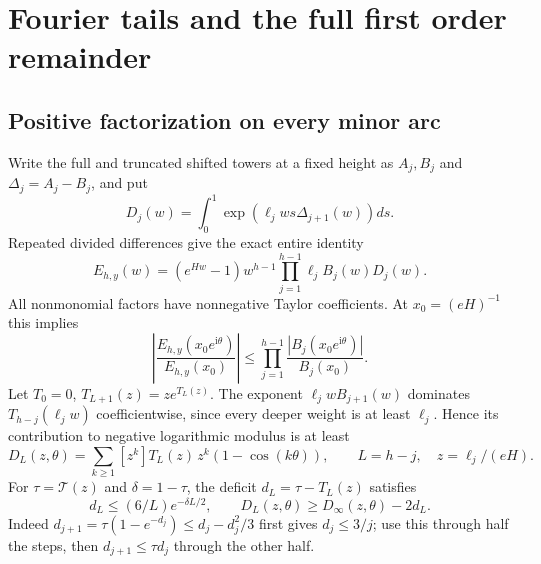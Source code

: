 \documentclass[11pt]{article}
\theoremstyle{remark}\newtheorem{remark}[theorem]{Remark}
\newcommand{\ii}{\mathrm i}
\newcommand{\TT}{\mathcal T}
\begin{document}
\section{Fourier tails and the full first order remainder}\label{xtw:frac:sec:minor}
\subsection{Positive factorization on every minor arc}
Write the full and truncated shifted towers at a fixed height as $A_j,B_j$
and $\Delta_j=A_j-B_j$, and put
\[
 D_j(w)=\int_0^1\exp(\ell_jws\Delta_{j+1}(w))ds.
\]
Repeated divided differences give the exact entire identity
\begin{equation}\label{xtw:frac:eq:factorization}
 E_{h,y}(w)=(e^{Hw}-1)w^{h-1}
                  \prod_{j=1}^{h-1}\ell_j B_j(w)D_j(w).
\end{equation}
All nonmonomial factors have nonnegative Taylor coefficients. At
$x_0=(eH)^{-1}$ this implies
\begin{equation}\label{xtw:frac:eq:minorproduct}
 \left|\frac{E_{h,y}(x_0e^{\ii\theta})}{E_{h,y}(x_0)}\right|
 \le\prod_{j=1}^{h-1}\frac{|B_j(x_0e^{\ii\theta})|}{B_j(x_0)}.
\end{equation}
Let $T_0=0$, $T_{L+1}(z)=ze^{T_L(z)}$. The exponent
$\ell_jwB_{j+1}(w)$ dominates $T_{h-j}(\ell_jw)$ coefficientwise,
since every deeper weight is at least $\ell_j$. Hence its contribution
to negative logarithmic modulus is at least
\[
 D_L(z,\theta)=\sum_{k\ge1}[z^k]T_L(z)\,z^k(1-\cos(k\theta)),\qquad
 L=h-j,\quad z=\ell_j/(eH).
\]
For $\tau=\TT(z)$ and $\delta=1-\tau$, the deficit
$d_L=\tau-T_L(z)$ satisfies
\begin{equation}\label{xtw:frac:eq:treedeficit}
 d_L\le(6/L)e^{-\delta L/2},\qquad
 D_L(z,\theta)\ge D_\infty(z,\theta)-2d_L.
\end{equation}
Indeed $d_{j+1}=\tau(1-e^{-d_j})\le d_j-d_j^2/3$ first gives
$d_j\le3/j$; use this through half the steps, then
$d_{j+1}\le\tau d_j$ through the other half.
\end{document}

